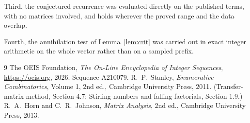 \documentclass[11pt,a4paper]{article}
\theoremstyle{plain}
\theoremstyle{definition}
\begin{document}
Third, the conjectured recurrence was evaluated directly on the published terms, with no
matrices involved, and holds wherever the proved range and the data overlap.

Fourth, the annihilation test of Lemma~\ref{lem:crit} was carried out in exact integer
arithmetic on the whole vector rather than on a sampled prefix.

\begin{thebibliography}{9}
 The OEIS Foundation, \emph{The On-Line Encyclopedia of Integer
Sequences}, \url{https://oeis.org}, 2026. Sequence A210079.
 R.~P.~Stanley, \emph{Enumerative Combinatorics}, Volume 1, 2nd ed.,
Cambridge University Press, 2011. (Transfer-matrix method, Section 4.7; Stirling numbers and
falling factorials, Section 1.9.)
 R.~A.~Horn and C.~R.~Johnson, \emph{Matrix Analysis}, 2nd ed., Cambridge
University Press, 2013.
\end{thebibliography}
\end{document}
